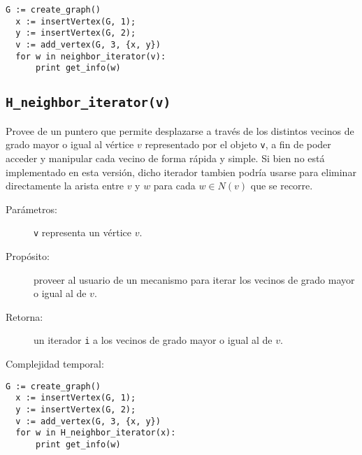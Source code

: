 \documentclass[%
    a4paper,%
    12pt,%
    twoside,%
    openright,%
    halfparskip,%
    cleardoubleempty,%
    bigheadings,%
    titlepage,%
    headsepline%
]{scrbook}
\makeatletter
\newcommand{\Code}[1]{\lstinline[basicstyle={\tt}]@#1@}
\makeatother
\begin{document}
\begin{lstlisting}[caption={Ejemplo de uso de neighbor\_iterator. El código crea un grafo $G$ con el vértice 1, el vértice 2 y el vértice 3. Luego, mediante el iterador de $v$ se recorre sus vecinos de menor grado y el ciclo imprime ``12''.},gobble=2,float=ht,label={lst:pseudo:neighbor_iterator},emph={neighbor_iterator}]
  G := create_graph()
  x := insertVertex(G, 1);
  y := insertVertex(G, 2);
  v := add_vertex(G, 3, {x, y})
  for w in neighbor_iterator(v):
      print get_info(w)
\end{lstlisting}


\subsection{\Code{H_neighbor_iterator(v)}}%
\label{sec:tad grafo:H-neighbors}

Provee de un puntero que permite desplazarse a través de los distintos vecinos de grado mayor o igual al vértice $v$ representado por el objeto \texttt{v}, a fin de poder acceder y manipular cada vecino de forma rápida y simple.  Si bien no está implementado en esta versión, dicho iterador tambien podría usarse para eliminar directamente la arista entre $v$ y $w$ para cada $w \in N(v)$ que se recorre.

\begin{description}
  \item [Parámetros:] \Code{v} representa un vértice $v$.
  \item [Propósito:] proveer al usuario de un mecanismo para iterar los vecinos de grado mayor o igual al de $v$.
  \item [Retorna:] un iterador \Code{i} a los vecinos de grado mayor o igual al de $v$.
  \item [Complejidad temporal:]
\end{description}


\begin{lstlisting}[caption={Ejemplo de uso de \Code{H_neighbor_iterator}. El código crea un grafo $G$ con el vértice 1, el vértice 2 y el vértice 3. Luego, mediante el iterador de $x$ se recorre sus vecinos de mayor o igual grado y el ciclo imprime ``3''.},gobble=2,float=ht,label={lst:pseudo:H_neighbors},emph={H_neighbors}]
  G := create_graph()
  x := insertVertex(G, 1);
  y := insertVertex(G, 2);
  v := add_vertex(G, 3, {x, y})
  for w in H_neighbor_iterator(x):
      print get_info(w)
\end{lstlisting}
\end{document}

